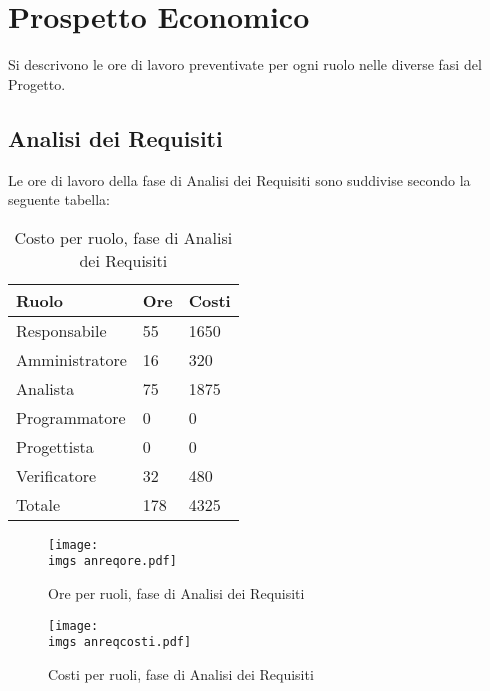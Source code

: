 \section{Prospetto Economico}{
	Si descrivono le ore di lavoro preventivate per ogni ruolo nelle diverse fasi del Progetto.
\subsection{Analisi dei Requisiti}{
	Le ore di lavoro della fase di Analisi dei Requisiti sono suddivise secondo la seguente tabella:
	\begin{table}[H]
		\centering
	  \begin{tabular}{p{}p{}
		    							p{}}
		   \toprule Ruolo & Ore & Costi \\
		   \midrule
		   Responsabile & 55 & 1650 \\
		   Amministratore & 16 & 320 \\
		   Analista & 75 & 1875 \\
		   Programmatore & 0 & 0 \\
		   Progettista & 0 & 0 \\
		   Verificatore & 32 & 480 \\
		   Totale & 178 & 4325 \\
		   \bottomrule
	 \end{tabular}
	 	\label{tab:costorequisiti}
	 	\caption{Costo per ruolo, fase di Analisi dei Requisiti}
	\end{table}
	
	\begin{figure}[H]
		\centering
		\texttt{[image: \\imgs anreqore.pdf]}
		\label{fig:orerequisiti}
		\caption{Ore per ruoli, fase di Analisi dei Requisiti}
	\end{figure}
	\begin{figure}[H]
		\centering
		\texttt{[image: \\imgs anreqcosti.pdf]}
		\label{fig:costorequisiti}
		\caption{Costi per ruoli, fase di Analisi dei Requisiti}
	\end{figure}
}
}
